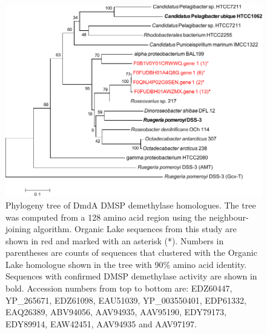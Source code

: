 \begin{figure}
\includegraphics[width=\textwidth]{orglake_figures/dmdA_tree.pdf}
\caption[Phylogeny of DmdA DMSP demethylase homologues]{Phylogeny tree of DmdA DMSP demethylase homologues. The tree was computed from a 128 amino acid region using the neighbour-joining algorithm. Organic Lake sequences from this study are shown in red and marked with an asterisk (*). Numbers in parentheses are counts of sequences that clustered with the Organic Lake homologue shown in the tree with 90\% amino acid identity. Sequences with confirmed DMSP demethylase activity are shown in bold. Accession numbers from top to bottom are: EDZ60447, YP\_265671, EDZ61098, EAU51039, YP\_003550401, EDP61332, EAQ26389, ABV94056, AAV94935, AAV95190, EDY79173, EDY89914, EAW42451, AAV94935 and AAV97197.}
\label{fig:dmdA_tree}

\end{figure}

